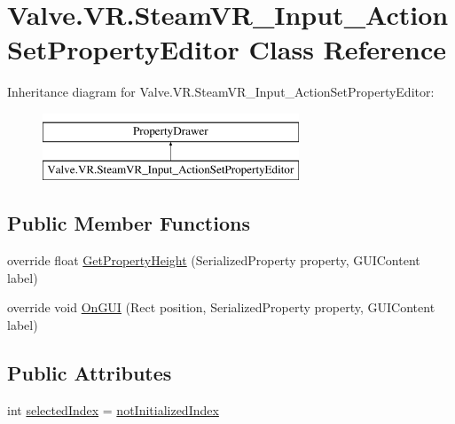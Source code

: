 \hypertarget{class_valve_1_1_v_r_1_1_steam_v_r___input___action_set_property_editor}{}\section{Valve.\+V\+R.\+Steam\+V\+R\+\_\+\+Input\+\_\+\+Action\+Set\+Property\+Editor Class Reference}
\label{class_valve_1_1_v_r_1_1_steam_v_r___input___action_set_property_editor}
Inheritance diagram for Valve.\+V\+R.\+Steam\+V\+R\+\_\+\+Input\+\_\+\+Action\+Set\+Property\+Editor\+:\begin{figure}[H]
\begin{center}
\leavevmode
\includegraphics[height=2.000000cm]{class_valve_1_1_v_r_1_1_steam_v_r___input___action_set_property_editor}
\end{center}
\end{figure}
\subsection*{Public Member Functions}
\begin{DoxyCompactItemize}
\item 
override float \mbox{\hyperlink{class_valve_1_1_v_r_1_1_steam_v_r___input___action_set_property_editor_a102877a32addf001f381bc336ecd07f3}{Get\+Property\+Height}} (Serialized\+Property property, G\+U\+I\+Content label)
\item 
override void \mbox{\hyperlink{class_valve_1_1_v_r_1_1_steam_v_r___input___action_set_property_editor_a87d1ba96689d1dca0022188bd806ec89}{On\+G\+UI}} (Rect position, Serialized\+Property property, G\+U\+I\+Content label)
\end{DoxyCompactItemize}
\subsection*{Public Attributes}
\begin{DoxyCompactItemize}
\item 
int \mbox{\hyperlink{class_valve_1_1_v_r_1_1_steam_v_r___input___action_set_property_editor_a44b8bf1bb0f63149daa3ab7c4b6850e1}{selected\+Index}} = \mbox{\hyperlink{class_valve_1_1_v_r_1_1_steam_v_r___input___action_set_property_editor_a2be8e8b2504b572a5d00cfd4ba31da8b}{not\+Initialized\+Index}}
\end{DoxyCompactItemize}
